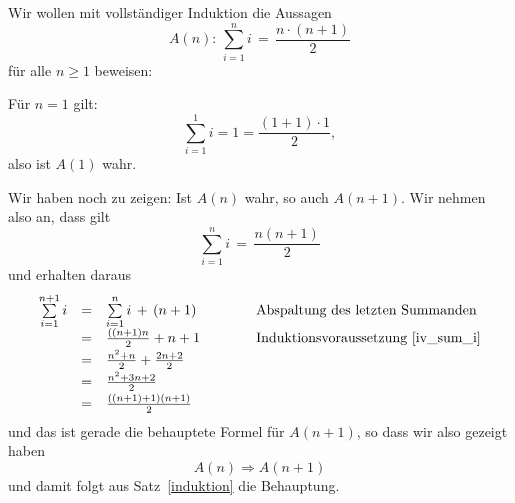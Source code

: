 \begin{beispiel} Wir wollen mit vollständiger Induktion die Aussagen 
  	$$ A(n) : \, \sum_{i=1}^n i \, = \, \frac {n \cdot (n+1)}{2} $$
für alle $n \geq 1$ beweisen:

Für $n = 1$ gilt: 
  	$$ \sum_{i = 1}^1 i = 1 = \frac {(1+1)\cdot 1}{2}, $$
also ist $A(1)$ wahr.

Wir haben noch zu zeigen: Ist $A(n)$ wahr, so auch $A(n+1)$. Wir nehmen also an, dass gilt
  	\begin{equation}\label{iv_sum_i} \sum_{i=1}^n i \, = \, \frac {n(n+1)}{2} \end{equation}
und erhalten daraus
  	$$ \begin{array} {l c l c l}
   	\sum\limits_{i=1}^{n+1} i & = & \sum\limits_{i=1}^n i \, + \, (n+1) & \qquad &  \textrm{Abspaltung des 
  	letzten Summanden} \\[0.2em]
     	& = & \frac {((n+1)n}{2} + {n+1} & & \textrm{Induktionsvoraussetzung~\ref{iv_sum_i}} \\[0.2em]
     	& = & \frac { n^2 + n}{2} + \frac {2n+2}{2} & & \\[0.2em]
     	& = & \frac {n^2 + 3n + 2}{2} & & \\[0.2em]
     	& = & \frac {((n+1)+1)(n+1)}{2} & &
    	\end{array} $$
und das ist gerade die behauptete Formel für $A(n+1)$, so dass wir also gezeigt haben 
  	$$ A(n) \Longrightarrow A(n+1) $$
und damit folgt aus Satz~\ref{induktion} die Behauptung.
\end{beispiel}

